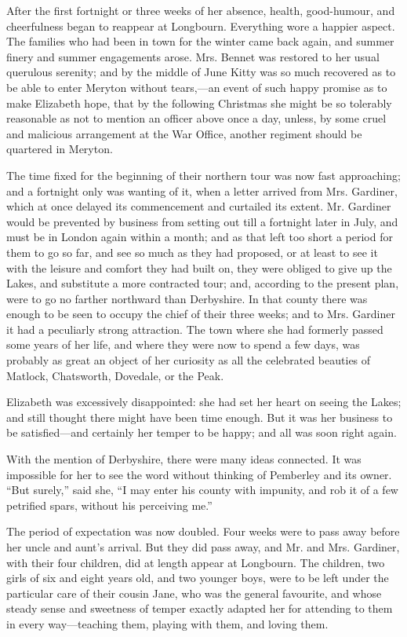 After the first fortnight or three weeks of her absence, health, good-humour, and cheerfulness began to reappear at Longbourn. Everything wore a happier aspect. The families who had been in town for the winter came back again, and summer finery and summer engagements arose. Mrs. Bennet was restored to her usual querulous serenity; and by the middle of June Kitty was so much recovered as to be able to enter Meryton without tears,---an event of such happy promise as to make Elizabeth hope, that by the following Christmas she might be so tolerably reasonable as not to mention an officer above once a day, unless, by some cruel and malicious arrangement at the War Office, another regiment should be quartered in Meryton.

The time fixed for the beginning of their northern tour was now fast approaching; and a fortnight only was wanting of it, when a letter arrived from Mrs. Gardiner, which at once delayed its commencement and curtailed its extent. Mr. Gardiner would be prevented by business from setting out till a fortnight later in July, and must be in London again within a month; and as that left too short a period for them to go so far, and see so much as they had proposed, or at least to see it with the leisure and comfort they had built on, they were obliged to give up the Lakes, and substitute a more contracted tour; and, according to the present plan, were to go no farther northward than Derbyshire. In that county there was enough to be seen to occupy the chief of their three weeks; and to Mrs. Gardiner it had a peculiarly strong attraction. The town where she had formerly passed some years of her life, and where they were now to spend a few days, was probably as great an object of her curiosity as all the celebrated beauties of Matlock, Chatsworth, Dovedale, or the Peak.

Elizabeth was excessively disappointed: she had set her heart on seeing the Lakes; and still thought there might have been time enough. But it was her business to be satisfied---and certainly her temper to be happy; and all was soon right again.

With the mention of Derbyshire, there were many ideas connected. It was impossible for her to see the word without thinking of Pemberley and its owner. ``But surely,'' said she, ``I may enter his county with impunity, and rob it of a few petrified spars, without his perceiving me.''

The period of expectation was now doubled. Four weeks were to pass away before her uncle and aunt's arrival. But they did pass away, and Mr. and Mrs. Gardiner, with their four children, did at length appear at Longbourn. The children, two girls of six and eight years old, and two younger boys, were to be left under the particular care of their cousin Jane, who was the general favourite, and whose steady sense and sweetness of temper exactly adapted her for attending to them in every way---teaching them, playing with them, and loving them.

